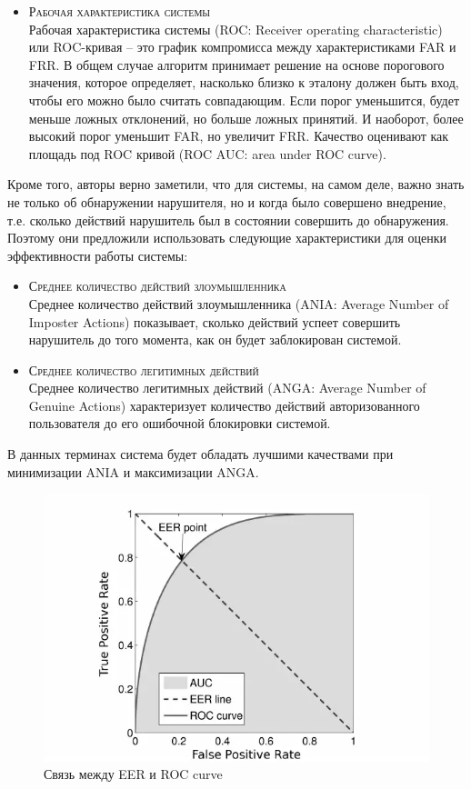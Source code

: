 \documentclass[12pt]{article}
\begin{document}
    \begin{itemize}
        \item \textsc{Рабочая характеристика системы} \\
        Рабочая характеристика системы (ROC: Receiver operating characteristic) или ROC-кривая -- это график компромисса между характеристиками FAR и FRR. В общем случае алгоритм принимает решение на основе порогового значения, которое определяет, насколько близко к эталону должен быть вход, чтобы его можно было считать совпадающим. Если порог уменьшится, будет меньше ложных отклонений, но больше ложных принятий. И наоборот, более высокий порог уменьшит FAR, но увеличит FRR. Качество оценивают как площадь под ROC кривой (ROC AUC: area under ROC curve).
    \end{itemize}

    \par Кроме того, авторы \cite{Mondal} верно заметили, что для системы, на самом деле, важно знать не только об обнаружении нарушителя, но и когда было совершено внедрение, т.е. сколько действий нарушитель был в состоянии совершить до обнаружения. Поэтому они предложили использовать следующие характеристики для оценки эффективности работы системы:

    \begin{itemize}
        \item \textsc{Среднее количество действий злоумышленника} \\
        Среднее количество действий злоумышленника (ANIA: Average Number of Imposter Actions) показывает, сколько действий успеет совершить нарушитель до того момента, как он будет заблокирован системой.
        \item \textsc{Среднее количество легитимных действий} \\
        Среднее количество легитимных действий (ANGA: Average Number of Genuine Actions) характеризует количество действий авторизованного пользователя до его ошибочной блокировки системой.
    \end{itemize}

    \par В данных терминах система будет обладать лучшими качествами при минимизации ANIA и максимизации ANGA.

    \begin{figure}[h!]
        \centering
        \includegraphics[width=0.7\linewidth]{EER_ROC.png}
        \caption{Связь между EER и ROC curve}
        \label{sec:Overview:Metrics:fig:EER_ROC}
    \end{figure}
\end{document}
